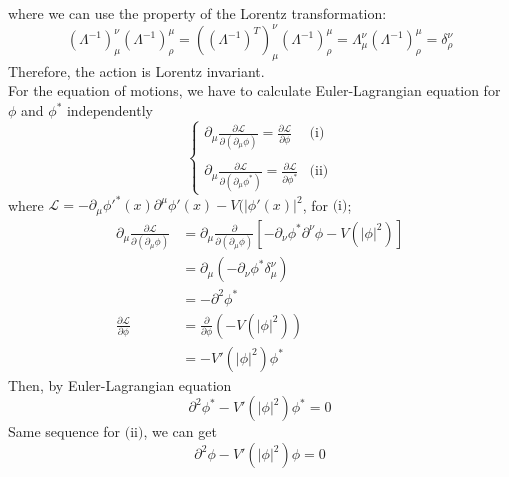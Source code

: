 \documentclass[11pt, a4paper]{article}
\begin{document}
where we can use the property of the Lorentz transformation:
$$ (\Lambda^{-1})^\nu_\mu(\Lambda^{-1})^\mu_\rho = ((\Lambda^{-1})^T)^\nu_\mu(\Lambda^{-1})^\mu_\rho = \Lambda^\nu_\mu(\Lambda^{-1})^\mu_\rho = \delta^\nu_\rho$$
Therefore, the action is Lorentz invariant. \\
For the equation of motions, we have to calculate Euler-Lagrangian equation for $\phi$ and $\phi^*$ independently
\begin{equation}
\begin{cases}
     \partial_\mu \frac{\partial \mathcal{L}}{\partial (\partial_\mu \phi)} = \frac{\partial \mathcal{L}}{\partial \phi} & \mbox{(i)}\\
     \\
    \partial_\mu \frac{\partial \mathcal{L}}{\partial (\partial_\mu \phi^*)} = \frac{\partial \mathcal{L}}{\partial \phi^*} & \mbox{(ii)}
\end{cases}
\end{equation}
where $\mathcal{L} =  -\partial_\mu \phi'^*(x) \partial^\mu \phi'(x) - V(|\phi'(x)|^2 $, for $\mbox{(i)}$;
\begin{align}
     \partial_\mu \frac{\partial \mathcal{L}}{\partial (\partial_\mu \phi)} & = \partial_\mu \frac{\partial}{\partial (\partial_\mu \phi)}\left[ -\partial_\nu \phi^* \partial^\nu \phi - V(|\phi|^2) \right] \\
    & = \partial_\mu (-\partial_\nu \phi^* \delta^\nu_\mu) \\
    & = -\partial^2\phi^* \\
    \frac{\partial \mathcal{L}}{\partial \phi} & = \frac{\partial}{\partial \phi} (-V(|\phi|^2) ) \\
    & = -V'(|\phi|^2) \phi^*
\end{align}
Then, by Euler-Lagrangian equation
\begin{equation}
    \partial^2\phi^* -V'(|\phi|^2) \phi^* = 0
\end{equation}
Same sequence for $\mbox{(ii)}$, we can get
\begin{equation}
    \partial^2\phi -V'(|\phi|^2) \phi = 0
\end{equation}
\end{document}
